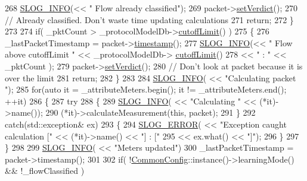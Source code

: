 \begin{DoxyCode}
268         \hyperlink{_logger_8h_a119c1c29ba35a8db38e2358e41167282}{SLOG\_INFO}(<< \textcolor{stringliteral}{" Flow already classified"});
269         packet->\hyperlink{class_vsid_common_1_1_i_pv4_packet_ae314f9e085588928d3c260211f80da87}{setVerdict}();
270         \textcolor{comment}{// Already classified. Don't waste time updating calculations}
271         \textcolor{keywordflow}{return};
272     \}
273 
274     \textcolor{keywordflow}{if}( \_pktCount > \_protocolModelDb->\hyperlink{class_vsid_1_1_protocol_model_db_a2df8e380ce56c8509007df98fce27d09}{cutoffLimit}() )
275     \{
276         \_lastPacketTimestamp = packet->\hyperlink{class_vsid_common_1_1_i_pv4_packet_abef9e70b733c8e5718153cb032ea6f1a}{timestamp}();
277         \hyperlink{_logger_8h_a119c1c29ba35a8db38e2358e41167282}{SLOG\_INFO}(<< \textcolor{stringliteral}{" Flow above cutoffLimit "} << \_protocolModelDb->
      \hyperlink{class_vsid_1_1_protocol_model_db_a2df8e380ce56c8509007df98fce27d09}{cutoffLimit}() 
278                         << \textcolor{stringliteral}{" : "} << \_pktCount );
279         packet->\hyperlink{class_vsid_common_1_1_i_pv4_packet_ae314f9e085588928d3c260211f80da87}{setVerdict}();
280         \textcolor{comment}{// Don't look at packet because it is over the limit}
281         \textcolor{keywordflow}{return};
282     \}
283 
284     \hyperlink{_logger_8h_a119c1c29ba35a8db38e2358e41167282}{SLOG\_INFO}( << \textcolor{stringliteral}{"Calculating packet "});
285     \textcolor{keywordflow}{for}(\textcolor{keyword}{auto} it = \_attributeMeters.begin(); it != \_attributeMeters.end(); ++it)
286     \{
287         \textcolor{keywordflow}{try}
288         \{
289             \hyperlink{_logger_8h_a119c1c29ba35a8db38e2358e41167282}{SLOG\_INFO}( << \textcolor{stringliteral}{"Calculating "} << (*it)->name());
290             (*it)->calculateMeasurement(\textcolor{keyword}{this}, packet);
291         \}
292         \textcolor{keywordflow}{catch}(std::exception& ex)
293         \{
294             \hyperlink{_logger_8h_a2a8694cd392d18f4db6b9cc9f15bafe3}{SLOG\_ERROR}( << \textcolor{stringliteral}{"Exception caught calculation ["} << (*it)->name() << \textcolor{stringliteral}{"] : ["}
295                             << ex.what() << \textcolor{stringliteral}{"]"});
296         \}
297     \}
298 
299     \hyperlink{_logger_8h_a119c1c29ba35a8db38e2358e41167282}{SLOG\_INFO}( << \textcolor{stringliteral}{"Meters updated"})
300     \_lastPacketTimestamp = packet->timestamp();
301 
302     if( !\hyperlink{class_vsid_common_1_1_common_config}{CommonConfig}::instance()->learningMode() && !\_flowClassified )

\end{DoxyCode}
